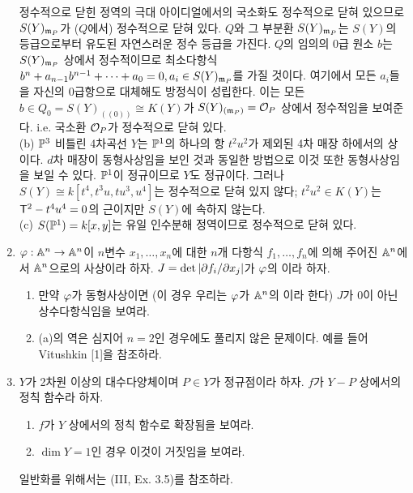 \begin{enumerate}[label=\tb{3.\arabic*.},itemindent=0mm,itemsep=4mm]
		정수적으로 닫힌 정역의 극대 아이디얼에서의 국소화도 정수적으로 닫혀 있으므로 $S(Y)_{\mathfrak{m}_P}$가 ($Q$에서) 정수적으로 닫혀 있다.
		$Q$와 그 부분환 $S(Y)_{\mathfrak{m}_P}$는 $S(Y)$의 등급으로부터 유도된 자연스러운 정수 등급을 가진다.
		$Q$의 임의의 0급 원소 $b$는 $S(Y)_{\mathfrak{m}_P}$ 상에서 정수적이므로
		최소다항식 $b^n+a_{n-1}b^{n-1}+\cdots+a_0=0,a_i\in S(Y)_{\mathfrak{m}_P}$를 가질 것이다.
		여기에서 모든 $a_i$들을 자신의 0급항으로 대체해도 방정식이 성립한다.
		이는 모든 $b\in Q_0=S(Y)_{((0))}\cong K(Y)$가 $S(Y)_{(\mathfrak{m}_P)}=\mathcal{O}_P$ 상에서 정수적임을 보여준다.
		i.e. 국소환 $\mathcal{O}_P$가 정수적으로 닫혀 있다.\\
		(b) $\mathbb{P}^3$ 비틀린 4차곡선 $Y$는 $\mathbb{P}^1$의 하나의 항 $t^2u^2$가 제외된 4차 매장 하에서의 상이다.
		$d$차 매장이 동형사상임을 보인 것과 동일한 방법으로 이것 또한 동형사상임을 보일 수 있다. $\mathbb{P}^1$이 정규이므로 $Y$도 정규이다.
		그러나 $S(Y)\cong k[t^4,t^3u,tu^3,u^4]$는 정수적으로 닫혀 있지 않다;
		$t^2u^2\in K(Y)$는 $\mathsf{T}^2-t^4u^4=0$의 근이지만 $S(Y)$에 속하지 않는다.\\
		(c) $S(\mathbb{P}^1)=k[x,y]$는 유일 인수분해 정역이므로 정수적으로 닫혀 있다.
		\item {} $\varphi:\mathbb{A}^n\rightarrow\mathbb{A}^n$이 $n$변수 $x_1,\ldots,x_n$에 대한
		$n$개 다항식 $f_1,\ldots,f_n$에 의해 주어진 $\mathbb{A}^n$에서 $\mathbb{A}^n$으로의 사상이라 하자.
		$J=\det|\partial f_i/\partial x_j|$가 $\varphi$의 이라 하자.
		\begin{enumerate}[label=(\alph*)]
			\item 만약 $\varphi$가 동형사상이면 (이 경우 우리는 $\varphi$가 $\mathbb{A}^n$의 이라 한다)
			$J$가 0이 아닌 상수다항식임을 보여라.
		\end{enumerate}
		\begin{enumerate}[label=**(\alph*)]
			\setcounter{enumii}{1}
			\item (a)의 역은 심지어 $n=2$인 경우에도 풀리지 않은 문제이다. 예를 들어 Vitushkin [1]을 참조하라.
		\end{enumerate}
		\sol
		\item $Y$가 2차원 이상의 대수다양체이며 $P\in Y$가 정규점이라 하자. $f$가 $Y-P$ 상에서의 정칙 함수라 하자.
		\begin{enumerate}[label=(\alph*)]
			\item $f$가 $Y$ 상에서의 정칙 함수로 확장됨을 보여라.
			\item $\dim Y=1$인 경우 이것이 거짓임을 보여라.
		\end{enumerate}
		일반화를 위해서는 (III, Ex. 3.5)를 참조하라.\\

\end{enumerate}
